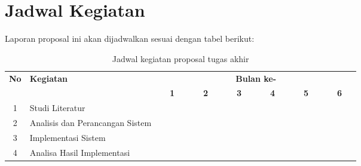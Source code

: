 \section{Jadwal Kegiatan}

Laporan proposal ini akan dijadwalkan sesuai dengan tabel berikut:

 
\begin{table}[h!]
  \centering
    \caption{Jadwal kegiatan proposal tugas akhir}
  \label{Novella}
  \begin{tabular}{|c|m{2.5cm}|m{0.01cm}|m{0.01cm}|m{0.01cm}|m{0.01cm}|m{0.01cm}|m{0.01cm}|m{0.01cm}|m{0.01cm}|m{0.01cm}|m{0.01cm}|m{0.01cm}|m{0.01cm}|m{0.01cm}|m{0.01cm}|m{0.01cm}|m{0.01cm}|m{0.01cm}|m{0.01cm}|m{0.01cm}|m{0.01cm}|m{0.01cm}|m{0.01cm}|m{0.01cm}|m{0.01cm}|}
    \hline
    \multirow{2}{*}{\textbf{No}} & \multirow{2}{*}{\textbf{Kegiatan}} & \multicolumn{24}{|c|}{\textbf{Bulan ke-}} \\
    \hhline{~~------------------------}
    {} & {} & \multicolumn{4}{|c|}{\textbf{1}} & \multicolumn{4}{|c|}{\textbf{2}} & \multicolumn{4}{|c|}{\textbf{3}} & \multicolumn{4}{|c|}{\textbf{4}} & \multicolumn{4}{|c|}{\textbf{5}} & \multicolumn{4}{|c|}{\textbf{6}}\\
    \hline
    1 & Studi Literatur & \cellcolor{blue!25} & \cellcolor{blue!25} & \cellcolor{blue!25} & \cellcolor{blue!25}& \cellcolor{blue!25} & \cellcolor{blue!25} & \cellcolor{blue!25} & \cellcolor{blue!25}& \cellcolor{blue!25} & \cellcolor{blue!25} & \cellcolor{blue!25} & \cellcolor{blue!25}& \cellcolor{blue!25} & \cellcolor{blue!25} & \cellcolor{blue!25} & \cellcolor{blue!25}& \cellcolor{blue!25} & \cellcolor{blue!25} & \cellcolor{blue!25} & \cellcolor{blue!25}& \cellcolor{blue!25} & \cellcolor{blue!25} & \cellcolor{blue!25} & \cellcolor{blue!25}\\
    \hline
    2 & Analisis dan Perancangan Sistem &  {} & {} & {} & {}  & \cellcolor{blue!25} & \cellcolor{blue!25} & \cellcolor{blue!25} & \cellcolor{blue!25} & \cellcolor{blue!25} & \cellcolor{blue!25} & \cellcolor{blue!25} & \cellcolor{blue!25} & {} & {} & {} & {}& {} & {} & {} & {}& {} & {} & {} & {}\\
    \hline
    3 & Implementasi Sistem &  {} & {} & {} & {} & {} & {} & {} & {}& \cellcolor{blue!25} & \cellcolor{blue!25} & \cellcolor{blue!25} & \cellcolor{blue!25} & \cellcolor{blue!25} & \cellcolor{blue!25} & \cellcolor{blue!25} & \cellcolor{blue!25} & {} & {} & {} & {}& {} & {} & {} & {}\\
    \hline
    4 & Analisa Hasil Implementasi &  {} & {} & {} & {} & {} & {} & {} & {}& {} & {} & {} & {} & \cellcolor{blue!25} & \cellcolor{blue!25} & \cellcolor{blue!25} & \cellcolor{blue!25} & \cellcolor{blue!25} & \cellcolor{blue!25} & \cellcolor{blue!25} & \cellcolor{blue!25} & {} & {} & {} & {}\\

\end{tabular}
\end{table}
